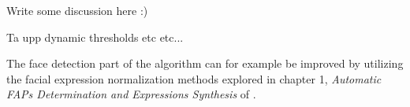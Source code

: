 Write some discussion here :)

Ta upp dynamic thresholds etc etc...

The face detection part of the algorithm can for example be improved by utilizing the facial expression normalization methods explored in chapter 1, \textit{Automatic FAPs Determination and Expressions Synthesis} of \cite{facialExpressions}.
